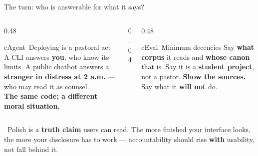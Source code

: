 \begin{frame}{The turn: who is answerable for what it says?}
  \begin{columns}[t, totalwidth=\textwidth]
    \begin{column}{0.48\textwidth}
      \begin{featbox}{cAgent}{\faGlobe\ Deploying is a pastoral act}
        \scriptsize
        A CLI answers \textbf{you}, who know its limits. A public chatbot answers a
        \textbf{stranger in distress at 2 a.m.} --- who may read it as counsel.
        \\[3pt]\textbf{The same code; a different moral situation.}
      \end{featbox}
    \end{column}
    \begin{column}{0.04\textwidth}\end{column}
    \begin{column}{0.48\textwidth}
      \begin{featbox}{cEval}{\faBalanceScale\ Minimum decencies}
        \scriptsize
        Say \textbf{what corpus} it reads and \textbf{whose canon} that is. Say it is a
        \textbf{student project}, not a pastor. \textbf{Show the sources.} Say what it
        \textbf{will not} do.
      \end{featbox}
    \end{column}
  \end{columns}
  \vspace{8pt}
  \begin{calloutbox}[accentgold]
    \small\faLightbulb\ Polish is a \textbf{truth claim} users can read. The more finished
    your interface looks, the more your disclosure has to work --- accountability should
    rise \textbf{with} usability, not fall behind it.
  \end{calloutbox}
\end{frame}

